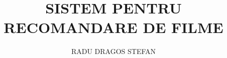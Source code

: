 \documentclass[12pt]{report}
\begin{document}
\title{SISTEM PENTRU RECOMANDARE DE FILME}					   
\author{RADU DRAGOS STEFAN}											
				
\maketitle


\newpage
\thispagestyle{empty}
\mbox{}
\newpage
{} 








\newpage
{}



\end{document}
